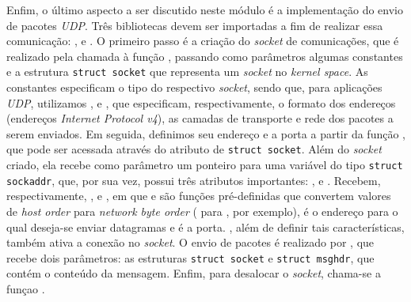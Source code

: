 Enfim, o último aspecto a ser discutido neste módulo é a implementação do envio
de pacotes \textit{UDP}. Três bibliotecas devem ser importadas a fim de realizar
essa comunicação: ,  e
. O primeiro passo é a criação do \textit{socket} de
comunicações, que é realizado pela chamada à função ,
passando como parâmetros algumas constantes e a estrutura \texttt{struct socket}
que representa um \textit{socket} no \textit{kernel space}. As constantes
especificam o tipo do respectivo \textit{socket}, sendo que, para aplicações
\textit{UDP}, utilizamos ,  e ,
que especificam, respectivamente, o formato dos endereços (endereços
\textit{Internet Protocol v4}), as camadas de transporte e rede dos pacotes a
serem enviados. Em seguida, definimos seu endereço e a porta a partir da função
, que pode ser acessada através do atributo  de
\texttt{struct socket}. Além do \textit{socket} criado, ela recebe como
parâmetro um ponteiro para uma variável do tipo \texttt{struct sockaddr}, que,
por sua vez, possui três atributos importantes: ,
 e . Recebem, respectivamente,
,  e , em que
 e  são funções pré-definidas que convertem valores
de \textit{host order} para \textit{network byte order} ( para
, por exemplo),  é o endereço para o qual
deseja-se enviar datagramas e  é a porta.
, além de definir tais características, também ativa a conexão
no \textit{socket}. O envio de pacotes é realizado por ,
que recebe dois parâmetros: as estruturas \texttt{struct socket} e
\texttt{struct msghdr}, que contém o conteúdo da mensagem. Enfim, para desalocar
o \textit{socket}, chama-se a funçao .

% 
% 
%  

